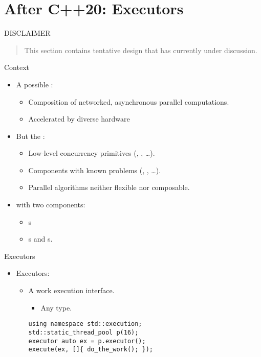 \section{After C++20: Executors}

\begin{frame}[t]{DISCLAIMER}
\begin{quote}
This section contains tentative design that
has currently under discussion.
\end{quote}
\end{frame}

\begin{frame}[t]{Context}
\begin{itemize}
  \item A possible :
    \begin{itemize}
      \item Composition of networked, asynchronous parallel computations.
      \item Accelerated by diverse hardware
    \end{itemize}
\vfill\pause
  \item But the :
    \begin{itemize}
      \item Low-level concurrency primitives 
            (, , \ldots).
      \item Components with known problems
            (, , \ldots).
      \item Parallel algorithms neither flexible nor composable.
    \end{itemize}
\vfill\pause
  \item {} with two components:
    \begin{itemize}
      \item {}s
      \item {}s and s.
    \end{itemize}
\end{itemize}
\end{frame}

\begin{frame}[t,fragile]{Executors}
\begin{itemize}
  \item Executors:
    \begin{itemize}
      \item A work execution interface.
        \begin{itemize}
          \item Any  type.
        \end{itemize}
\begin{lstlisting}
using namespace std::execution;
std::static_thread_pool p(16);
executor auto ex = p.executor();
execute(ex, []{ do_the_work(); });
\end{lstlisting}
    \end{itemize}
\end{itemize}
\end{frame}

